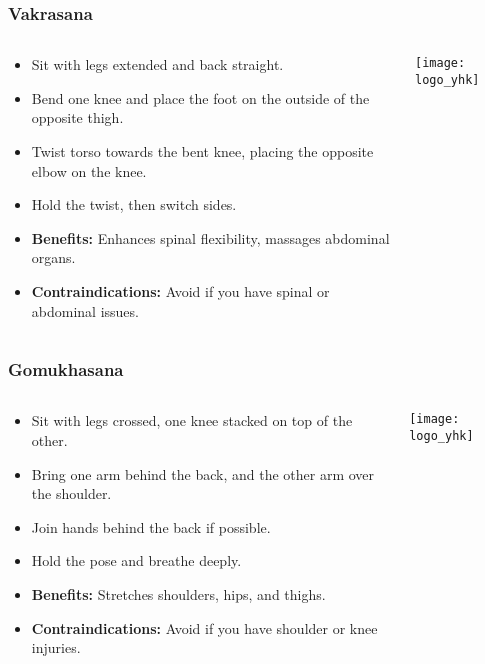 \begin{frame}[fragile]\frametitle{Vakrasana}
\begin{columns}
    \begin{column}[T]{0.5\linewidth}
      \begin{itemize}
        \item Sit with legs extended and back straight.
        \item Bend one knee and place the foot on the outside of the opposite thigh.
        \item Twist torso towards the bent knee, placing the opposite elbow on the knee.
        \item Hold the twist, then switch sides.
        \item \textbf{Benefits:} Enhances spinal flexibility, massages abdominal organs.
        \item \textbf{Contraindications:} Avoid if you have spinal or abdominal issues.
      \end{itemize}
    \end{column}
    \begin{column}[T]{0.5\linewidth}
        \begin{center}
        \texttt{[image: logo\_yhk]}
        \end{center}    
    \end{column}
  \end{columns}
\end{frame}

\begin{frame}[fragile]\frametitle{Gomukhasana}
\begin{columns}
    \begin{column}[T]{0.5\linewidth}
      \begin{itemize}
        \item Sit with legs crossed, one knee stacked on top of the other.
        \item Bring one arm behind the back, and the other arm over the shoulder.
        \item Join hands behind the back if possible.
        \item Hold the pose and breathe deeply.
        \item \textbf{Benefits:} Stretches shoulders, hips, and thighs.
        \item \textbf{Contraindications:} Avoid if you have shoulder or knee injuries.
      \end{itemize}
    \end{column}
    \begin{column}[T]{0.5\linewidth}
        \begin{center}
        \texttt{[image: logo\_yhk]}
        \end{center}    
    \end{column}
  \end{columns}
\end{frame}


